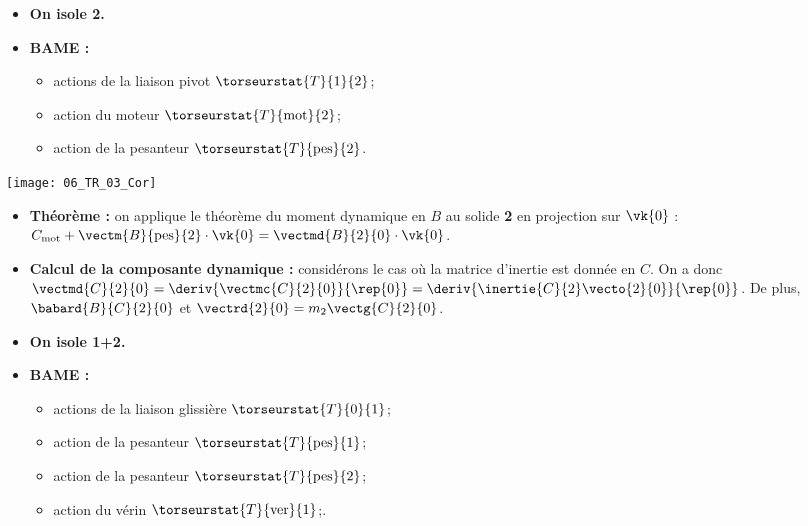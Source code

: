 \vspace{.5cm}

\begin{itemize}
\item \textbf{On isole 2.}
\end{itemize}

\begin{itemize}
\item \textbf{BAME :}
\begin{itemize}
\item actions de la liaison pivot $\torseurstat{T}{1}{2}$;
\item action du moteur $\torseurstat{T}{\text{mot}}{2}$;
\item action de la pesanteur $\torseurstat{T}{\text{pes}}{2}$.
\end{itemize}
\end{itemize}

\begin{marginfigure}
\texttt{[image: 06\_TR\_03\_Cor]}
\end{marginfigure}

\begin{itemize}
\item \textbf{Théorème :} on applique le théorème du moment dynamique en $B$ au solide \textbf{2} en projection sur $\vk{0}$ : $C_{\text{mot}}+\vectm{B}{\text{pes}}{2}\cdot \vk{0}  = \vectmd{B}{2}{0}\cdot \vk{0}$.
\item \textbf{Calcul de la composante dynamique :} considérons le cas où la matrice d'inertie est donnée en $C$. On a donc 
$\vectmd{C}{2}{0}= \deriv{\vectmc{C}{2}{0}}{\rep{0}}=\deriv{\inertie{C}{2}\vecto{2}{0}}{\rep{0}}$. De plus, 
$\babard{B}{C}{2}{0}$ et $\vectrd{2}{0}=m_2 \vectg{C}{2}{0}$.
\end{itemize}

\begin{itemize}
\item \textbf{On isole 1+2.}
\end{itemize}

\begin{itemize}
\item \textbf{BAME :}
\begin{itemize}
\item actions de la liaison glissière $\torseurstat{T}{0}{1}$;
\item action de la pesanteur $\torseurstat{T}{\text{pes}}{1}$;
\item action de la pesanteur $\torseurstat{T}{\text{pes}}{2}$;
\item action du vérin $\torseurstat{T}{\text{ver}}{1}$;.
\end{itemize}
\end{itemize}

